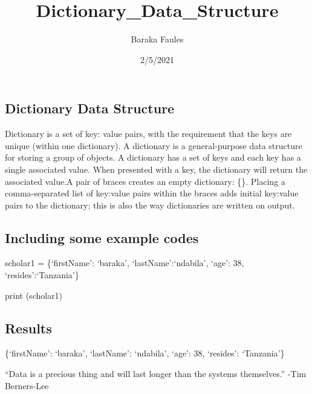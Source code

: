 \documentclass[
]{article}
\title{Dictionary\_Data\_Structure}
\author{Baraka Faules}
\date{2/5/2021}
\begin{document}
\maketitle

\hypertarget{dictionary-data-structure}{%
\subsection{Dictionary Data Structure}\label{dictionary-data-structure}}

Dictionary is a set of key: value pairs, with the requirement that the
keys are unique (within one dictionary). A dictionary is a
general-purpose data structure for storing a group of objects. A
dictionary has a set of keys and each key has a single associated value.
When presented with a key, the dictionary will return the associated
value.A pair of braces creates an empty dictionary: \{\}. Placing a
comma-separated list of key:value pairs within the braces adds initial
key:value pairs to the dictionary; this is also the way dictionaries are
written on output.

\hypertarget{including-some-example-codes}{%
\subsection{Including some example
codes}\label{including-some-example-codes}}

scholar1 = \{`firstName': `baraka', `lastName':`ndabila', `age': 38,
`resides':`Tanzania'\}

print (scholar1)

\hypertarget{results}{%
\subsection{Results}\label{results}}

\{`firstName': `baraka', `lastName': `ndabila', `age': 38, `resides':
`Tanzania'\}

``Data is a precious thing and will last longer than the systems
themselves.'' -Tim Berners-Lee
\end{document}
